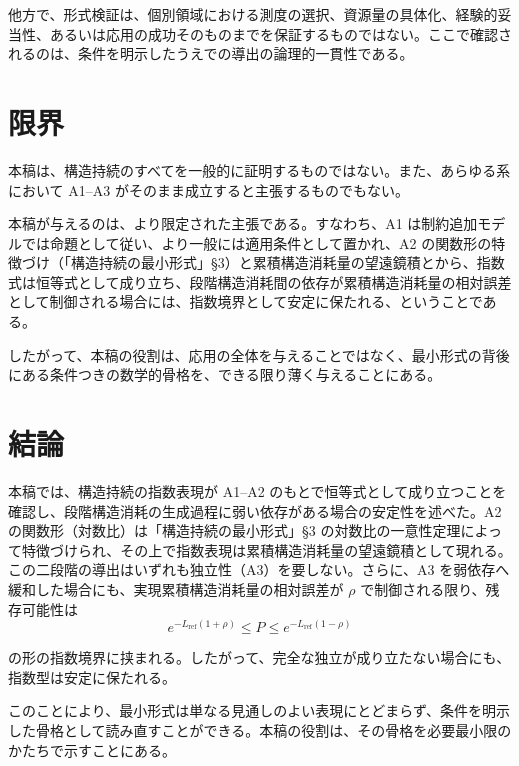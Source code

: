 \documentclass[12pt,a4paper]{article}
\begin{document}
他方で、形式検証は、個別領域における測度の選択、資源量の具体化、経験的妥当性、あるいは応用の成功そのものまでを保証するものではない。ここで確認されるのは、条件を明示したうえでの導出の論理的一貫性である。

\section{限界}\label{ux9650ux754c}

本稿は、構造持続のすべてを一般的に証明するものではない。また、あらゆる系において A1--A3 がそのまま成立すると主張するものでもない。

本稿が与えるのは、より限定された主張である。すなわち、A1 は制約追加モデルでは命題として従い、より一般には適用条件として置かれ、A2 の関数形の特徴づけ（「構造持続の最小形式」§3）と累積構造消耗量の望遠鏡積とから、指数式は恒等式として成り立ち、段階構造消耗間の依存が累積構造消耗量の相対誤差として制御される場合には、指数境界として安定に保たれる、ということである。

したがって、本稿の役割は、応用の全体を与えることではなく、最小形式の背後にある条件つきの数学的骨格を、できる限り薄く与えることにある。

\section{結論}\label{ux7d50ux8ad6}

本稿では、構造持続の指数表現が A1--A2 のもとで恒等式として成り立つことを確認し、段階構造消耗の生成過程に弱い依存がある場合の安定性を述べた。A2 の関数形（対数比）は「構造持続の最小形式」§3 の対数比の一意性定理によって特徴づけられ、その上で指数表現は累積構造消耗量の望遠鏡積として現れる。この二段階の導出はいずれも独立性（A3）を要しない。さらに、A3 を弱依存へ緩和した場合にも、実現累積構造消耗量の相対誤差が \(\rho\) で制御される限り、残存可能性は \[
e^{-L_{\text{ref}}(1+\rho)} \le P \le e^{-L_{\text{ref}}(1-\rho)}
\]

の形の指数境界に挟まれる。したがって、完全な独立が成り立たない場合にも、指数型は安定に保たれる。

このことにより、最小形式は単なる見通しのよい表現にとどまらず、条件を明示した骨格として読み直すことができる。本稿の役割は、その骨格を必要最小限のかたちで示すことにある。
\end{document}
